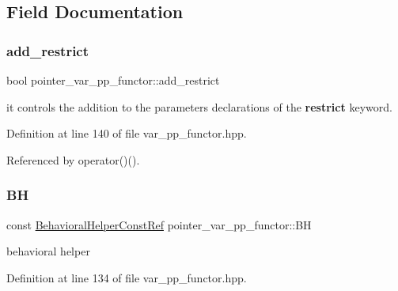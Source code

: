 \subsection{Field Documentation}
\mbox{\label{structpointer__var__pp__functor_a82b8606531c82524d5d1546c211ea02d}} 
\subsubsection{\texorpdfstring{add\+\_\+restrict}{add\_restrict}}
{\footnotesize\ttfamily bool pointer\+\_\+var\+\_\+pp\+\_\+functor\+::add\+\_\+restrict\hspace{0.3cm}{\ttfamily [private]}}



it controls the addition to the parameters declarations of the {\bfseries restrict} keyword. 



Definition at line 140 of file var\+\_\+pp\+\_\+functor.\+hpp.



Referenced by operator()().

\mbox{\label{structpointer__var__pp__functor_a115f115b53e9f803772b7899749d7d58}} 
\subsubsection{\texorpdfstring{BH}{BH}}
{\footnotesize\ttfamily const \hyperlink{behavioral__helper_8hpp_aae973b54cac87eef3b27442aa3e1e425}{Behavioral\+Helper\+Const\+Ref} pointer\+\_\+var\+\_\+pp\+\_\+functor\+::\+BH\hspace{0.3cm}{\ttfamily [private]}}



behavioral helper 



Definition at line 134 of file var\+\_\+pp\+\_\+functor.\+hpp.



